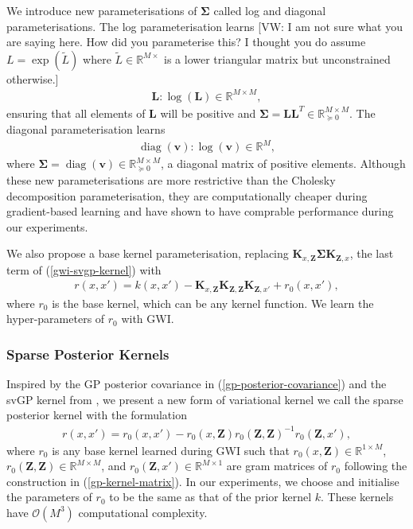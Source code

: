 \documentclass{article}
\newcommand{\vw}[1]{{\color{green} [VW: #1]}}
\newcommand{\bbR}{\mathbb{R}}
\newcommand{\diag}{\operatorname{diag}}
\numberwithin{equation}{section}
\begin{document}
We introduce new parameterisations of $\mathbf{\Sigma}$ called log and diagonal parameterisations. The log parameterisation learns \vw{I am not sure what you are saying here. How did you parameterise this? I thought you do assume $L = \exp(\widetilde{L})$ where $\widetilde{L} \in \bbR^{M \times}$ is a lower triangular matrix but unconstrained otherwise.}
\begin{align}
    \mathbf{L}: \log\left(\mathbf{L}\right) \in \mathbb{R}^{M \times M},
\end{align}
ensuring that all elements of $\mathbf{L}$ will be positive and $\mathbf{\Sigma} = \mathbf{L}\mathbf{L}^T \in \mathbb{R}^{M \times M}_{\succcurlyeq 0}$. The diagonal parameterisation learns
\begin{align}
    \diag(\mathbf{v}): \log(\mathbf{v}) \in \mathbb{R}^M,
\end{align}
where $\mathbf{\Sigma} = \diag(\mathbf{v}) \in \mathbb{R}^{M \times M}_{\succcurlyeq 0}$, a diagonal matrix of positive elements. Although these new parameterisations are more restrictive than the Cholesky decomposition parameterisation, they are computationally cheaper during gradient-based learning and have shown to have comprable performance during our experiments.

We also propose a base kernel parameterisation, replacing $\mathbf{K}_{x, \mathbf{Z}} \mathbf{\Sigma} \mathbf{K}_{\mathbf{Z}, x}$, the last term of (\ref{gwi-svgp-kernel}) with
\begin{align}
    r(x, x') = k(x, x') - \mathbf{K}_{x, \mathbf{Z}} \mathbf{K}_{\mathbf{Z}, \mathbf{Z}} \mathbf{K}_{\mathbf{Z}, x'} + r_0(x, x'),
    \label{gwi-svgp-kernel}
\end{align}
where $r_0$ is the base kernel, which can be any kernel function. We learn the hyper-parameters of $r_0$ with GWI. 

\subsubsection{Sparse Posterior Kernels}
Inspired by the GP posterior covariance in (\ref{gp-posterior-covariance}) and the svGP kernel from \cite{titsias2009variational}, we present a new form of variational kernel we call the sparse posterior kernel with the formulation
\begin{align}
    r(x, x') = r_0(x, x') - r_0\left(x, \mathbf{Z}\right) r_0\left(\mathbf{Z}, \mathbf{Z}\right)^{-1} r_0\left(\mathbf{Z}, x'\right),
\end{align}
where $r_0$ is any base kernel learned during GWI such that $r_0\left(x, \mathbf{Z}\right) \in \mathbb{R}^{1 \times M}$, $r_0\left(\mathbf{Z}, \mathbf{Z}\right) \in \mathbb{R}^{M \times M}$, and $r_0\left(\mathbf{Z}, x'\right) \in \mathbb{R}^{M \times 1}$ are gram matrices of $r_0$ following the construction in (\ref{gp-kernel-matrix}).
In our experiments, we choose and initialise the parameters of $r_0$ to be the same as that of the prior kernel $k$.
These kernels have $\mathcal{O}(M^3)$ computational complexity.
\end{document}
